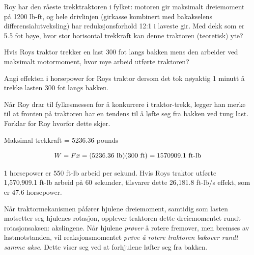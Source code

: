

Roy har den råeste trekktraktoren i fylket: motoren gir maksimalt dreiemoment på 1200 lb-ft, og hele drivlinjen (girkasse kombinert med bakakselens differensialutveksling) har reduksjonsforhold 12:1 i laveste gir. Med dekk som er 5.5 fot høye, hvor stor horisontal trekkraft kan denne traktoren (teoretisk) yte?

\vskip 10pt

Hvis Roys traktor trekker en last 300 fot langs bakken mens den arbeider ved maksimalt motormoment, hvor mye arbeid utførte traktoren?

\vskip 10pt

Angi effekten i horsepower for Roys traktor dersom det tok nøyaktig 1 minutt å trekke lasten 300 fot langs bakken.

\vskip 10pt

Når Roy drar til fylkesmessen for å konkurrere i traktor-trekk, legger han merke til at fronten på traktoren har en tendens til å løfte seg fra bakken ved tung last. Forklar for Roy hvorfor dette skjer.







Maksimal trekkraft = 5236.36 pounds
 
\vskip 10pt

$$W = F x = (5236.36 \hbox{ lb}) (300 \hbox{ ft}) = 1570909.1 \hbox{ ft-lb}$$

\vskip 10pt

1 horsepower er 550 ft-lb arbeid per sekund. Hvis Roys traktor utførte 1,570,909.1 ft-lb arbeid på 60 sekunder, tilsvarer dette 26,181.8 ft-lb/s effekt, som er 47.6 horsepower.

\vskip 10pt

Når traktormekanismen påfører hjulene dreiemoment, samtidig som lasten motsetter seg hjulenes rotasjon, opplever traktoren dette dreiemomentet rundt rotasjonsaksen: akslingene. Når hjulene {\it prøver} å rotere fremover, men bremses av lastmotstanden, vil reaksjonsmomentet {\it prøve å rotere traktoren bakover rundt samme akse}. Dette viser seg ved at forhjulene løfter seg fra bakken.










